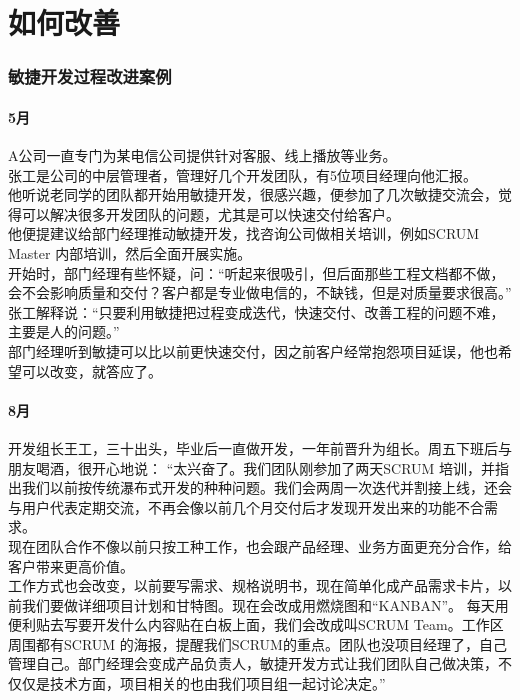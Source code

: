 \chapter{如何改善} %

\hypertarget{ux654fux6377ux5f00ux53d1ux8fc7ux7a0bux6539ux8fdbux6848ux4f8b}{%
\subsection{敏捷开发过程改进案例}\label{ux654fux6377ux5f00ux53d1ux8fc7ux7a0bux6539ux8fdbux6848ux4f8b}}

\hypertarget{ux6708}{%
\subsubsection{5月}\label{ux6708}}

A公司一直专门为某电信公司提供针对客服、线上播放等业务。\\
张工是公司的中层管理者，管理好几个开发团队，有5位项目经理向他汇报。\\
他听说老同学的团队都开始用敏捷开发，很感兴趣，便参加了几次敏捷交流会，觉得可以解决很多开发团队的问题，尤其是可以快速交付给客户。\\
他便提建议给部门经理推动敏捷开发，找咨询公司做相关培训，例如SCRUM Master 内部培训，然后全面开展实施。\\
开始时，部门经理有些怀疑，问：“听起来很吸引，但后面那些工程文档都不做，会不会影响质量和交付？客户都是专业做电信的，不缺钱，但是对质量要求很高。”\\
张工解释说：“只要利用敏捷把过程变成迭代，快速交付、改善工程的问题不难，主要是人的问题。”\\
部门经理听到敏捷可以比以前更快速交付，因之前客户经常抱怨项目延误，他也希望可以改变，就答应了。 \\

\hypertarget{ux6708-1}{%
\subsubsection{8月}\label{ux6708-1}}

开发组长王工，三十出头，毕业后一直做开发，一年前晋升为组长。周五下班后与朋友喝酒，很开心地说： “太兴奋了。我们团队刚参加了两天SCRUM 培训，并指出我们以前按传统瀑布式开发的种种问题。我们会两周一次迭代并割接上线，还会与用户代表定期交流，不再会像以前几个月交付后才发现开发出来的功能不合需求。\\
现在团队合作不像以前只按工种工作，也会跟产品经理、业务方面更充分合作，给客户带来更高价值。\\
工作方式也会改变，以前要写需求、规格说明书，现在简单化成产品需求卡片，以前我们要做详细项目计划和甘特图。现在会改成用燃烧图和“KANBAN”。 每天用便利贴去写要开发什么内容贴在白板上面，我们会改成叫SCRUM Team。工作区周围都有SCRUM 的海报，提醒我们SCRUM的重点。团队也没项目经理了，自己管理自己。部门经理会变成产品负责人，敏捷开发方式让我们团队自己做决策，不仅仅是技术方面，项目相关的也由我们项目组一起讨论决定。”\\

